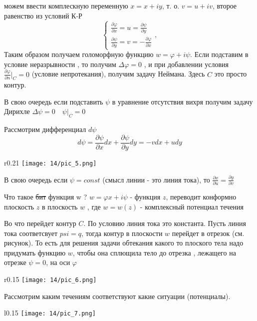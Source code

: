 можем ввести комплескную переменную $x = x + i y$, т. о. $v = u + iv$, второе равенство из условий К-Р
$$ \begin{cases}
    \frac{\partial \varphi}{\partial x} = u  = \frac{\partial \psi}{\partial y} \\
    \frac{\partial \psi}{\partial y} = v = -\frac{\partial \varphi}{\partial x}
  \end{cases},$$
Таким образом получаем голоморфную функцию $w = \varphi + i \psi$. Если подставим в условие неразрывности , то получим $\Delta \varphi = 0$ , и при добавлении условия $\frac{\partial \varphi}{\partial n} |_C = 0 $ (условие непротекания), получим задачу Неймана. Здесь $C$ это просто контур.

В свою очередь если подставить $\psi $ в уравнение отсутствия вихря получим задачу Дирихле
$ \Delta \psi = 0 \quad \psi |_C = 0$



Рассмотрим дифференциал $d \psi$
$$
  d \psi = \frac{\partial \psi}{\partial x}  dx +  \frac{\partial \psi}{\partial y}  dy = -vdx + udy
$$
\begin{wrapfigure}{r}{0.21\textwidth}
  \texttt{[image: 14/pic\_5.png]}
  \caption{\label{ris:image14.5}}
\end{wrapfigure}
В свою очередь если $\psi = const $ (смысл линии - это линия тока), то $\frac{\partial x}{\partial u} = \frac{\partial y}{\partial v} $


Что такое \sout{бит}  функция w ? $w = \varphi x + i \psi$ - функция $z$, переводит конформно плоскость $z$ в плоскость $w$ , где $w=w(z)$ - комплексный потенциал течения

Во что перейдет контур $C$. По условию линия тока это константа. Пусть линия тока соответсвует $psi = q$, тогда контур в плоскости $w$ перейдет в отрезок (см. рисунок). То есть для решения задачи обтекания какого то плоского тела надо придумать функцию $w$, чтобы она сплющила тело до отрезка , лежащего на отрезке $\psi = 0$, на оси $\varphi$
$$$$
\newpage

\begin{wrapfigure}{r}{0.15\textwidth}
  \texttt{[image: 14/pic\_6.png]}
  \caption{\label{ris:image14.6}}
\end{wrapfigure}



Рассмотрим каким течениям соответствуют какие  ситуации (потенциалы).

\begin{wrapfigure}{l}{0.15\textwidth}
  \texttt{[image: 14/pic\_7.png]}
  \caption{\label{ris:image14.7}}
\end{wrapfigure}

